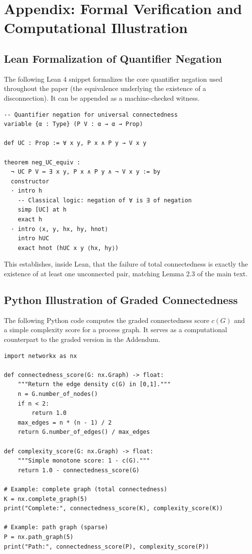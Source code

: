 \documentclass[11pt,a4paper]{article}
\theoremstyle{definition}
\begin{document}
\section{Appendix: Formal Verification and Computational Illustration}

\subsection{Lean Formalization of Quantifier Negation}

The following Lean 4 snippet formalizes the core quantifier negation used throughout the paper (the equivalence underlying the existence of a disconnection). It can be appended as a machine-checked witness.

\begin{lstlisting}[style=lean]
-- Quantifier negation for universal connectedness
variable {α : Type} (P V : α → α → Prop)

def UC : Prop := ∀ x y, P x ∧ P y → V x y

theorem neg_UC_equiv :
  ¬ UC P V ↔ ∃ x y, P x ∧ P y ∧ ¬ V x y := by
  constructor
  · intro h
    -- Classical logic: negation of ∀ is ∃ of negation
    simp [UC] at h
    exact h
  · intro ⟨x, y, hx, hy, hnot⟩
    intro hUC
    exact hnot (hUC x y ⟨hx, hy⟩)
\end{lstlisting}

This establishes, inside Lean, that the failure of total connectedness is exactly the existence of at least one unconnected pair, matching Lemma 2.3 of the main text.

\subsection{Python Illustration of Graded Connectedness}

The following Python code computes the graded connectedness score \(c(G)\) and a simple complexity score for a process graph. It serves as a computational counterpart to the graded version in the Addendum.

\begin{lstlisting}[style=python]
import networkx as nx

def connectedness_score(G: nx.Graph) -> float:
    """Return the edge density c(G) in [0,1]."""
    n = G.number_of_nodes()
    if n < 2:
        return 1.0
    max_edges = n * (n - 1) / 2
    return G.number_of_edges() / max_edges

def complexity_score(G: nx.Graph) -> float:
    """Simple monotone score: 1 - c(G)."""
    return 1.0 - connectedness_score(G)

# Example: complete graph (total connectedness)
K = nx.complete_graph(5)
print("Complete:", connectedness_score(K), complexity_score(K))

# Example: path graph (sparse)
P = nx.path_graph(5)
print("Path:", connectedness_score(P), complexity_score(P))
\end{lstlisting}
\end{document}
